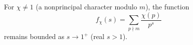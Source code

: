 For $\chi \neq 1$ (a nonprincipal character modulo $m$), the function
$$
f_\chi(s) = \sum_{p \nmid m} \frac{\chi(p)}{p^s}
$$
remains bounded as $s \to 1^+$ (real $s > 1$).
